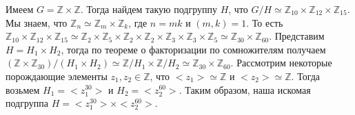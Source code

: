 \documentclass[a4paper, 12pt]{article}
\begin{document}
	Имеем $G = \mathbb Z \times \mathbb Z$. Тогда найдем такую подгруппу $H$, что $G/H \simeq \mathbb Z_{10} \times \mathbb Z_{12} \times \mathbb Z_{15}$. Мы знаем, что $\mathbb Z_n \simeq \mathbb Z_m \times \mathbb Z_k$, где $n = mk$ и $(m, k) = 1$. То есть $\mathbb Z_{10} \times \mathbb Z_{12} \times \mathbb Z_{15} \simeq \mathbb Z_2 \times \mathbb Z_5 \times \mathbb Z_2 \times \mathbb Z_2 \times \mathbb Z_3 \times \mathbb Z_3 \times \mathbb Z_5 \simeq \mathbb Z_{30} \times \mathbb Z_{60}$. Представим $H = H_1 \times H_2$, тогда по теореме о факторизации по сомножителям получаем $(\mathbb Z \times \mathbb Z_{30})/(H_1 \times H_2) \simeq \mathbb Z/H_1 \times \mathbb Z/H_2 \simeq \mathbb Z_{30} \times \mathbb Z_{60}$. Рассмотрим некоторые порождающие элементы $z_1, z_2 \in \mathbb Z$, что $<z_1> \simeq \mathbb Z$ и $<z_2> \simeq \mathbb Z$. Тогда возьмем $H_1 = <z^{30}_1>$ и $H_2 = <z^{60}_2>$. Таким образом, наша искомая подгруппа $H = <z^{30}_1> \times <z^{60}_2>$. \\
	
	
\end{document}
